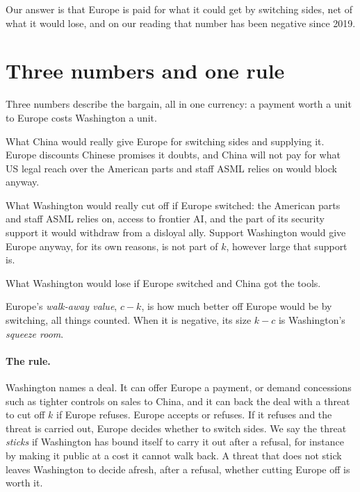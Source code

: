 \documentclass[11pt]{article}
\begin{document}
Our answer is that Europe is paid for what it could get by switching sides, net of what it would lose, and on our reading that number has been negative since 2019.

\section{Three numbers and one rule}

Three numbers describe the bargain, all in one currency: a payment worth a unit to Europe costs Washington a unit.

\begin{description}[leftmargin=1.2em, labelindent=0em]
\item[China's offer, $c\ge 0$.] What China would really give Europe for switching sides and supplying it. Europe discounts Chinese promises it doubts, and China will not pay for what US legal reach over the American parts and staff ASML relies on would block anyway.
\item[Washington's penalty, $k\ge 0$.] What Washington would really cut off if Europe switched: the American parts and staff ASML relies on, access to frontier AI, and the part of its security support it would withdraw from a disloyal ally. Support Washington would give Europe anyway, for its own reasons, is not part of $k$, however large that support is.
\item[Washington's need, $V>0$.] What Washington would lose if Europe switched and China got the tools.
\end{description}

\noindent Europe's \emph{walk-away value}, $c-k$, is how much better off Europe would be by switching, all things counted. When it is negative, its size $k-c$ is Washington's \emph{squeeze room}.

\paragraph{The rule.} Washington names a deal. It can offer Europe a payment, or demand concessions such as tighter controls on sales to China, and it can back the deal with a threat to cut off $k$ if Europe refuses. Europe accepts or refuses. If it refuses and the threat is carried out, Europe decides whether to switch sides. We say the threat \emph{sticks} if Washington has bound itself to carry it out after a refusal, for instance by making it public at a cost it cannot walk back. A threat that does not stick leaves Washington to decide afresh, after a refusal, whether cutting Europe off is worth it.
\end{document}
